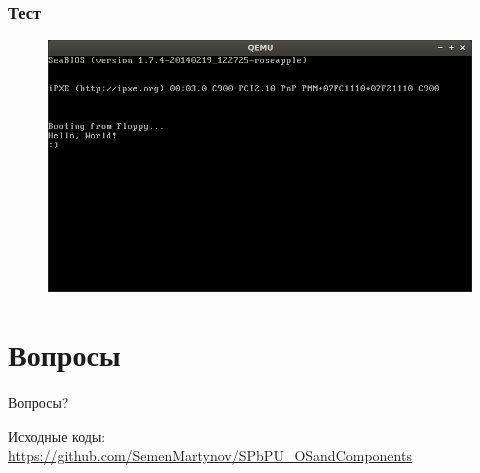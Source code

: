\documentclass{beamer}
\begin{document}
\begin{frame}
\frametitle{Тест}

\begin{figure}
\includegraphics[scale=0.48]{res/qemu}
\end{figure}

\end{frame}

\section{Вопросы}

\begin{frame}
\begin{minipage}[t][.8\textheight]{\textwidth}
	\vspace{5em}
    {\Huge{\centerline{Вопросы?}}}

    \vfill

    Исходные коды:\\ \url{https://github.com/SemenMartynov/SPbPU_OSandComponents}
\end{minipage}
\end{frame}

\end{document}
